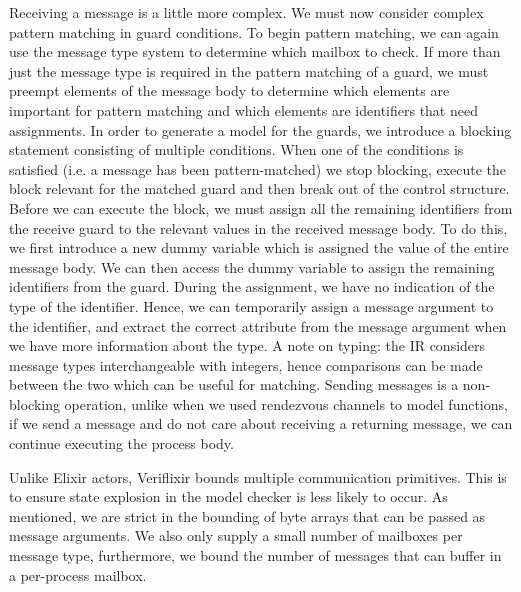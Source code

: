 \par
Receiving a message is a little more complex. We must now consider complex pattern matching in guard conditions. To begin pattern matching, we can again use the message type system to determine which mailbox to check. If more than just the message type is required in the pattern matching of a guard, we must preempt elements of the message body to determine which elements are important for pattern matching and which elements are identifiers that need assignments. In order to generate a model for the guards, we introduce a blocking statement consisting of multiple conditions. When one of the conditions is satisfied (i.e. a message has been pattern-matched) we stop blocking, execute the block relevant for the matched guard and then break out of the control structure. Before we can execute the block, we must assign all the remaining identifiers from the receive guard to the relevant values in the received message body. To do this, we first introduce a new dummy variable which is assigned the value of the entire message body. We can then access the dummy variable to assign the remaining identifiers from the guard. During the assignment, we have no indication of the type of the identifier. Hence, we can temporarily assign a message argument to the identifier, and extract the correct attribute from the message argument when we have more information about the type. A note on typing: the IR considers message types interchangeable with integers, hence comparisons can be made between the two which can be useful for matching. Sending messages is a non-blocking operation, unlike when we used rendezvous channels to model functions, if we send a message and do not care about receiving a returning message, we can continue executing the process body.
\par
Unlike Elixir actors, Veriflixir bounds multiple communication primitives. This is to ensure state explosion in the model checker is less likely to occur. As mentioned, we are strict in the bounding of byte arrays that can be passed as message arguments. We also only supply a small number of mailboxes per message type, furthermore, we bound the number of messages that can buffer in a per-process mailbox.
